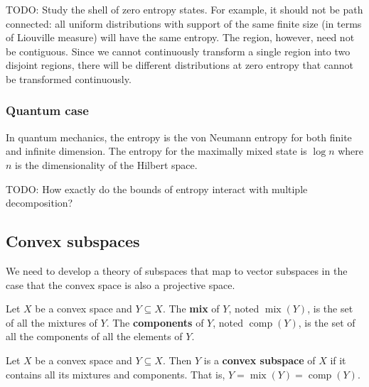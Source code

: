 \documentclass[11pt]{article}
\DeclareMathOperator{\mix}{mix}
\DeclareMathOperator{\component}{comp}
\begin{document}
TODO: Study the shell of zero entropy states. For example, it should not be path connected: all uniform distributions with support of the same finite size (in terms of Liouville measure) will have the same entropy. The region, however, need not be contiguous. Since we cannot continuously transform a single region into two disjoint regions, there will be different distributions at zero entropy that cannot be transformed continuously.

\subsubsection{Quantum case}

In quantum mechanics, the entropy is the von Neumann entropy for both finite and infinite dimension. The entropy for the maximally mixed state is $\log n$ where $n$ is the dimensionality of the Hilbert space.

TODO: How exactly do the bounds of entropy interact with multiple decomposition?

\subsection{Convex subspaces}

We need to develop a theory of subspaces that map to vector subspaces in the case that the convex space is also a projective space.

\begin{defn}
	Let $X$ be a convex space and $Y \subseteq X$. The \textbf{mix} of $Y$, noted $\mix(Y)$, is the set of all the mixtures of $Y$. The \textbf{components} of $Y$, noted $\component(Y)$, is the set of all the components of all the elements of $Y$.
\end{defn}

\begin{defn}
	Let $X$ be a convex space and $Y \subseteq X$. Then $Y$ is a \textbf{convex subspace} of $X$ if it contains all its mixtures and components. That is, $Y = \mix(Y) = \component(Y)$.
\end{defn}
\end{document}
